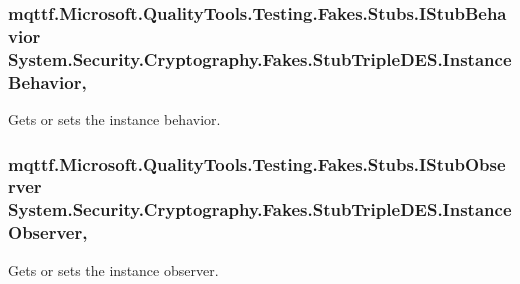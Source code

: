 \hypertarget{class_system_1_1_security_1_1_cryptography_1_1_fakes_1_1_stub_triple_d_e_s_a8557fc663387a98e274ca39b87f3f531}{
\subsubsection[{Instance\-Behavior}]{\setlength{\rightskip}{0pt plus 5cm}mqttf.\-Microsoft.\-Quality\-Tools.\-Testing.\-Fakes.\-Stubs.\-I\-Stub\-Behavior System.\-Security.\-Cryptography.\-Fakes.\-Stub\-Triple\-D\-E\-S.\-Instance\-Behavior\hspace{0.3cm}{\ttfamily [get]}, {\ttfamily [set]}}}\label{class_system_1_1_security_1_1_cryptography_1_1_fakes_1_1_stub_triple_d_e_s_a8557fc663387a98e274ca39b87f3f531}


Gets or sets the instance behavior.

\hypertarget{class_system_1_1_security_1_1_cryptography_1_1_fakes_1_1_stub_triple_d_e_s_a18560a12306bf7ab3f40a8b0f0e8795e}{
\subsubsection[{Instance\-Observer}]{\setlength{\rightskip}{0pt plus 5cm}mqttf.\-Microsoft.\-Quality\-Tools.\-Testing.\-Fakes.\-Stubs.\-I\-Stub\-Observer System.\-Security.\-Cryptography.\-Fakes.\-Stub\-Triple\-D\-E\-S.\-Instance\-Observer\hspace{0.3cm}{\ttfamily [get]}, {\ttfamily [set]}}}\label{class_system_1_1_security_1_1_cryptography_1_1_fakes_1_1_stub_triple_d_e_s_a18560a12306bf7ab3f40a8b0f0e8795e}


Gets or sets the instance observer.

